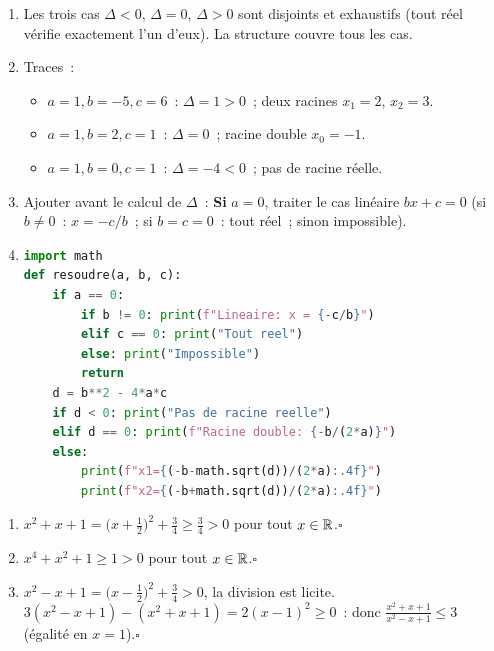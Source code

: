 \begin{enumerate}
  \item Les trois cas $\Delta<0$, $\Delta=0$, $\Delta>0$ sont disjoints et exhaustifs
        (tout r\'eel v\'erifie exactement l'un d'eux). La structure couvre tous les cas.\checkmark
  \item Traces~:
  \begin{itemize}
    \item $a=1,b=-5,c=6$~: $\Delta=1>0$~; deux racines $x_1=2$, $x_2=3$.
    \item $a=1,b=2,c=1$~: $\Delta=0$~; racine double $x_0=-1$.
    \item $a=1,b=0,c=1$~: $\Delta=-4<0$~; pas de racine r\'eelle.
  \end{itemize}
  \item Ajouter avant le calcul de $\Delta$~: \textbf{Si} $a=0$, traiter le cas lin\'eaire
        $bx+c=0$ (si $b\ne0$~: $x=-c/b$~; si $b=c=0$~: tout r\'eel~; sinon impossible).
  \item
\begin{lstlisting}[language=Python]
import math
def resoudre(a, b, c):
    if a == 0:
        if b != 0: print(f"Lineaire: x = {-c/b}")
        elif c == 0: print("Tout reel")
        else: print("Impossible")
        return
    d = b**2 - 4*a*c
    if d < 0: print("Pas de racine reelle")
    elif d == 0: print(f"Racine double: {-b/(2*a)}")
    else:
        print(f"x1={(-b-math.sqrt(d))/(2*a):.4f}")
        print(f"x2={(-b+math.sqrt(d))/(2*a):.4f}")
\end{lstlisting}
\end{enumerate}


\begin{enumerate}
  \item $x^2+x+1=\bigl(x+\tfrac{1}{2}\bigr)^2+\tfrac{3}{4}\geq\tfrac{3}{4}>0$
        pour tout $x\in\mathbb{R}$.\hfill$\square$
  \item $x^4+x^2+1\geq1>0$ pour tout $x\in\mathbb{R}$.\hfill$\square$
  \item $x^2-x+1=\bigl(x-\tfrac{1}{2}\bigr)^2+\tfrac{3}{4}>0$, la division est licite.
        $3(x^2-x+1)-(x^2+x+1)=2(x-1)^2\geq0$~:
        donc $\frac{x^2+x+1}{x^2-x+1}\leq3$ (\'egalit\'e en $x=1$).\hfill$\square$
\end{enumerate}


